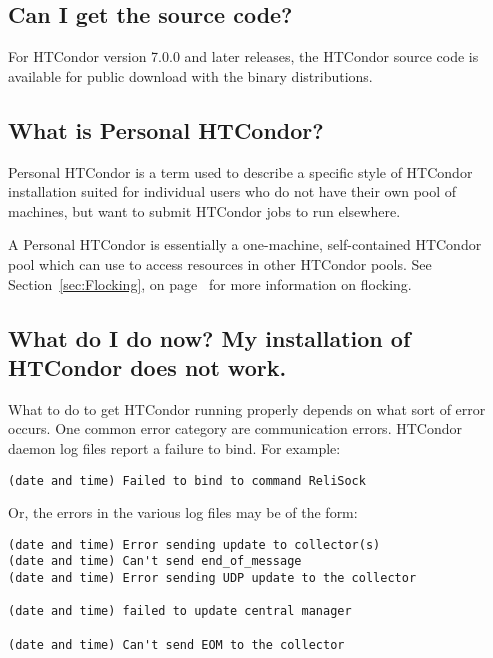\subsection*{Can I get the source code?}

For HTCondor version 7.0.0 and later releases,
the HTCondor source code is available for 
public download with the binary distributions.

\subsection*{What is Personal HTCondor?}

Personal HTCondor is a term used to describe a specific style of HTCondor
installation suited for individual users who do not have their own
pool of machines, but want to submit HTCondor jobs to run elsewhere.

A Personal HTCondor is essentially a one-machine, self-contained HTCondor
pool which can use  to access resources in other HTCondor
pools.
See Section~\ref{sec:Flocking}, on page~\pageref{sec:Flocking} for
more information on flocking.


\subsection*{What do I do now? My installation of HTCondor does not work.}

What to do to get HTCondor running properly depends on what sort of
error occurs. 
One common error category are communication errors.
HTCondor daemon log files report a failure to bind.
For example:

\footnotesize
\begin{verbatim}
(date and time) Failed to bind to command ReliSock
\end{verbatim}
\normalsize

Or, the errors in the various log files may be of the form:

\footnotesize
\begin{verbatim}
(date and time) Error sending update to collector(s)
(date and time) Can't send end_of_message
(date and time) Error sending UDP update to the collector

(date and time) failed to update central manager

(date and time) Can't send EOM to the collector
\end{verbatim}
\normalsize

